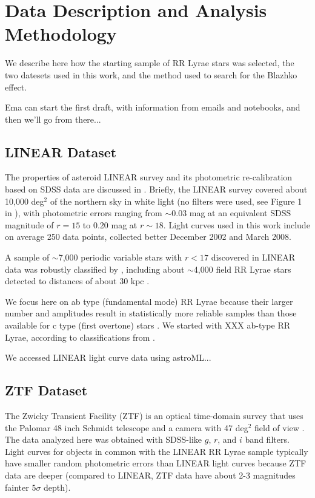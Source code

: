 

\section{Data Description and Analysis Methodology\label{sec:analysis}}

We describe here how the starting sample of RR Lyrae stars was selected, the two datesets used in this work,
and the method used to search for the Blazhko effect.

Ema can start the first draft, with information from emails and notebooks, and then we'll go from there...


\subsection{LINEAR Dataset}

The properties of asteroid LINEAR survey and its photometric re-calibration based on SDSS data are discussed in \cite{2011AJ....142..190S}.
Briefly, the LINEAR survey covered about 10,000 deg$^2$ of the northern sky in white light (no filters were used, see Figure 1 in \citealt{2011AJ....142..190S}),
with photometric errors ranging from $\sim$0.03 mag at an equivalent SDSS magnitude of $r=15$ to 0.20 mag at $r\sim18$. Light curves used
in this work include on average 250 data points, collected better December 2002 and March 2008.
 
A sample of $\sim$7,000 periodic variable stars with $r<17$ discovered in LINEAR data was robustly classified by \cite{2013AJ....146..101P}, including
about $\sim$4,000 field RR Lyrae stars detected to distances of about 30 kpc \citep{2013AJ....146...21S}. 

We focus here on ab type (fundamental mode) RR Lyrae because their larger number and amplitudes result in statistically
more reliable samples than those available for c type (first overtone) stars \cite{2016CoKon.105...61K}.
We started with XXX ab-type RR Lyrae, according to classifications from \cite{2013AJ....146..101P}.

We accessed LINEAR light curve data using astroML...


\subsection{ZTF Dataset}

The Zwicky Transient Facility (ZTF) is an optical time-domain survey that uses the Palomar 48 inch Schmidt telescope
and a camera with 47 deg$^2$ field of view \citep{2019PASP..131a8002B}. The data analyzed here was obtained with
SDSS-like $g$, $r$, and $i$ band filters. Light curves for objects in common with the LINEAR RR Lyrae sample typically
have smaller random photometric errors than LINEAR light curves because ZTF data are deeper (compared to LINEAR,
ZTF data have about 2-3 magnitudes fainter  $5\sigma$ depth).

